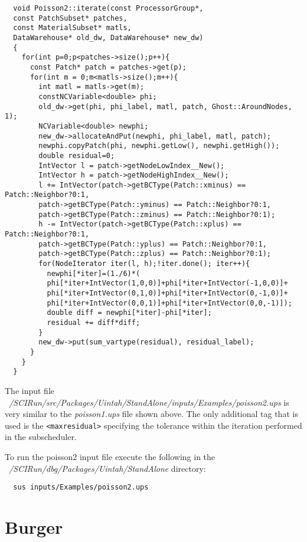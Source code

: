\documentclass[11pt,fleqn]{book} %
\begin{document}
\begin{lstlisting}
  void Poisson2::iterate(const ProcessorGroup*,
  const PatchSubset* patches,
  const MaterialSubset* matls,
  DataWarehouse* old_dw, DataWarehouse* new_dw)
  {
    for(int p=0;p<patches->size();p++){
      const Patch* patch = patches->get(p);
      for(int m = 0;m<matls->size();m++){
        int matl = matls->get(m);
        constNCVariable<double> phi;
        old_dw->get(phi, phi_label, matl, patch, Ghost::AroundNodes, 1);
        NCVariable<double> newphi;
        new_dw->allocateAndPut(newphi, phi_label, matl, patch);
        newphi.copyPatch(phi, newphi.getLow(), newphi.getHigh());
        double residual=0;
        IntVector l = patch->getNodeLowIndex__New();
        IntVector h = patch->getNodeHighIndex__New(); 
        l += IntVector(patch->getBCType(Patch::xminus) == Patch::Neighbor?0:1,
        patch->getBCType(Patch::yminus) == Patch::Neighbor?0:1,
        patch->getBCType(Patch::zminus) == Patch::Neighbor?0:1);
        h -= IntVector(patch->getBCType(Patch::xplus) == Patch::Neighbor?0:1,
        patch->getBCType(Patch::yplus) == Patch::Neighbor?0:1,
        patch->getBCType(Patch::zplus) == Patch::Neighbor?0:1);
        for(NodeIterator iter(l, h);!iter.done(); iter++){
          newphi[*iter]=(1./6)*(
          phi[*iter+IntVector(1,0,0)]+phi[*iter+IntVector(-1,0,0)]+
          phi[*iter+IntVector(0,1,0)]+phi[*iter+IntVector(0,-1,0)]+
          phi[*iter+IntVector(0,0,1)]+phi[*iter+IntVector(0,0,-1)]);
          double diff = newphi[*iter]-phi[*iter];
          residual += diff*diff;
        }
        new_dw->put(sum_vartype(residual), residual_label);
      }
    }
  }

\end{lstlisting}

The input file
\emph{~/SCIRun/src/Packages/Uintah/StandAlone/inputs/Examples/poisson2.ups}
is very similar to the \emph{poisson1.ups} file shown above.  The only
additional tag that is used is the \texttt{<maxresidual>} specifying
the tolerance within the iteration performed in the subscheduler.

To run the poisson2 input file execute the following in the
\emph{~/SCIRun/dbg/Packages/Uintah/StandAlone} directory:

\begin{lstlisting}
  sus inputs/Examples/poisson2.ups

\end{lstlisting}


\section{Burger}
\end{document}

